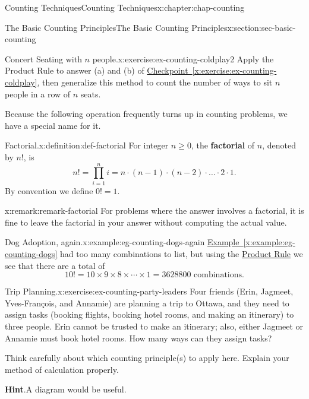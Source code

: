 \documentclass[oneside,10pt,]{book}
\newcommand{\blocktitlefont}{\relax}
\newcommand{\xreffont}{\relax}
\newcommand{\terminology}[1]{\textbf{#1}}
\numberwithin{equation}{section}
\begin{document}
\begin{chapterptx}{Counting Techniques}{}{Counting Techniques}{}{}{x:chapter:chap-counting}
\begin{sectionptx}{The Basic Counting Principles}{}{The Basic Counting Principles}{}{}{x:section:sec-basic-counting}
\begin{inlineexercise}{Concert Seating with \(n\) people.}{x:exercise:ex-counting-coldplay2}
Apply the Product Rule to answer (a) and (b) of \hyperref[x:exercise:ex-counting-coldplay]{Checkpoint~{\xreffont\ref{x:exercise:ex-counting-coldplay}}}, then generalize this method to count the number of ways to sit \(n\) people in a row of \(n\) seats.%
\end{inlineexercise}%
Because the following operation frequently turns up in counting problems, we have a special name for it.%
\begin{definition}{Factorial.}{x:definition:def-factorial}%
For integer \(n \geq 0\), the \terminology{factorial} of \(n\), denoted by \(n!\), is%
\begin{equation*}
n! = \prod_{i=1}^n i = n \cdot (n-1) \cdot (n-2) \cdot \ldots \cdot 2 \cdot 1\text{.}
\end{equation*}
By convention we define \(0! = 1\). \label{g:notation:id523645}%
\end{definition}
\begin{remark}{}{x:remark:remark-factorial}%
For problems where the answer involves a factorial, it is fine to leave the factorial in your answer without computing the actual value.%
\end{remark}
\begin{example}{Dog Adoption, again.}{x:example:eg-counting-dogs-again}%
\hyperref[x:example:eg-counting-dogs]{Example~{\xreffont\ref{x:example:eg-counting-dogs}}} had too many combinations to list, but using the \hyperref[x:principle:prin-prod-rule]{Product Rule} we see that there are a total of%
\begin{equation*}
10! = 10 \times 9 \times 8 \times \cdots \times 1 = 3628800 \text{ combinations}\text{.}
\end{equation*}
%
\end{example}
\begin{inlineexercise}{Trip Planning.}{x:exercise:ex-counting-party-leaders}%
Four friends (Erin, Jagmeet, Yves-François, and Annamie) are planning a trip to Ottawa, and they need to assign tasks (booking flights, booking hotel rooms, and making an itinerary) to three people. Erin cannot be trusted to make an itinerary; also, either Jagmeet or Annamie must book hotel rooms. How many ways can they assign tasks?%
\par
Think carefully about which counting principle(s) to apply here. Explain your method of calculation properly.%
\par\smallskip%
\noindent\textbf{\blocktitlefont Hint}.\hypertarget{g:hint:id523727}{}\quad{}A diagram would be useful.%
\end{inlineexercise}%

\end{sectionptx}
\end{chapterptx}
\end{document}
